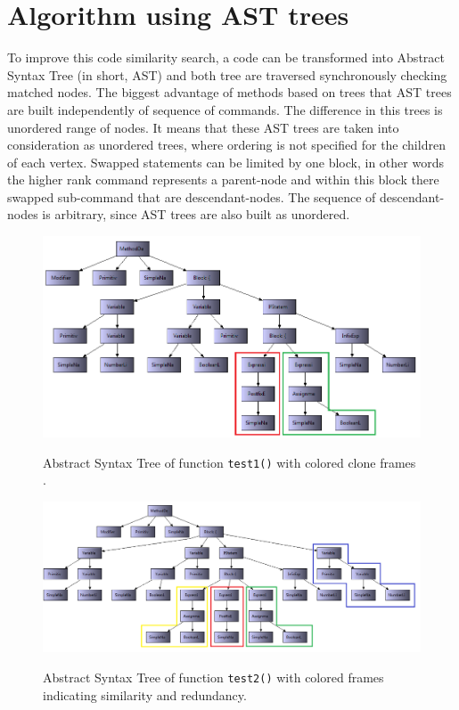 \documentclass{report}
\begin{document}
\section{Algorithm using AST trees}
To improve this code similarity search, a code can be transformed into Abstract Syntax Tree (in short, AST) and both tree are traversed synchronously checking matched nodes. The biggest advantage of methods based on trees that AST trees are built independently of sequence of commands. The difference in this trees is unordered range of nodes. It means that these AST trees are taken into consideration as unordered trees, where ordering is not specified for the children of each vertex. Swapped statements can be limited by one block, in other words the higher rank command represents a parent-node and within this block there swapped sub-command that are 
descendant-nodes. The sequence of descendant-nodes is arbitrary, since AST trees are also built as unordered.\\
\begin{figure}[h]
  \centering
  \includegraphics[width=1.00\textwidth]{Figures/text-to-text/graph-compared1.png}\\[0.1cm]
  \caption[Abstract Syntax Tree with colored clone frames]{Abstract Syntax Tree of function \texttt{test1()} with colored clone frames .}
  \label{fig:graph-compared1}
\end{figure}

\begin{figure}[h]
  \centering
  \includegraphics[width=1.00\textwidth]{Figures/text-to-text/graph-compared2.png}\\[0.1cm]
  \caption[]{Abstract Syntax Tree of function \texttt{test2()} with colored frames indicating similarity and redundancy.}
  \label{fig:graph-compared2}
\end{figure}
\end{document}
